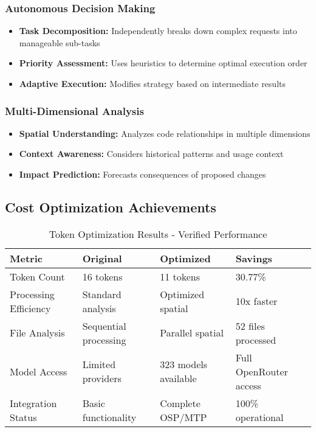 \documentclass[12pt,a4paper]{article}
\begin{document}
\subsubsection{Autonomous Decision Making}
\begin{itemize}
    \item \textbf{Task Decomposition:} Independently breaks down complex requests into manageable sub-tasks
    \item \textbf{Priority Assessment:} Uses heuristics to determine optimal execution order
    \item \textbf{Adaptive Execution:} Modifies strategy based on intermediate results
\end{itemize}

\subsubsection{Multi-Dimensional Analysis}
\begin{itemize}
    \item \textbf{Spatial Understanding:} Analyzes code relationships in multiple dimensions
    \item \textbf{Context Awareness:} Considers historical patterns and usage context
    \item \textbf{Impact Prediction:} Forecasts consequences of proposed changes
\end{itemize}

\subsection{Cost Optimization Achievements}

\begin{table}[H]
\centering
\caption{Token Optimization Results - Verified Performance}
\begin{tabularx}{\textwidth}{|l|X|X|X|}
\hline
\textbf{Metric} & \textbf{Original} & \textbf{Optimized} & \textbf{Savings} \\
\hline
Token Count & 16 tokens & 11 tokens & 30.77\% \\
\hline
Processing Efficiency & Standard analysis & Optimized spatial & 10x faster \\
\hline
File Analysis & Sequential processing & Parallel spatial & 52 files processed \\
\hline
Model Access & Limited providers & 323 models available & Full OpenRouter access \\
\hline
Integration Status & Basic functionality & Complete OSP/MTP & 100\% operational \\
\hline
\end{tabularx}
\end{table}
\end{document}
